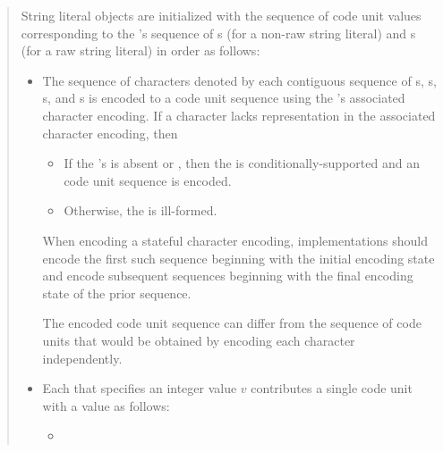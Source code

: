 \documentclass{wg21}
\begin{document}
\begin{quote}

String literal objects are initialized with
the sequence of code unit values
corresponding to the 's sequence of
s (for a non-raw string literal) and
s (for a raw string literal)
in order as follows:
\begin{itemize}
    \item
    The sequence of characters denoted by each contiguous sequence of
    s,
    s,
    s, and
    s
    is encoded to a code unit sequence
    using the 's associated character encoding.
    If a character lacks representation in the associated character encoding, then 
    \begin{removedblock}
        \begin{itemize}
            \item
            If the 's 
            is absent or ,
            then the  is conditionally-supported and
            an
            code unit sequence is encoded.
            \item
            Otherwise, the  is ill-formed.
        \end{itemize}
    \end{removedblock}
    When encoding a stateful character encoding,
    implementations should encode the first such sequence
    beginning with the initial encoding state and
    encode subsequent sequences
    beginning with the final encoding state of the prior sequence.
    \begin{note}
        The encoded code unit sequence can differ from
        the sequence of code units that would be obtained by
        encoding each character independently.
    \end{note}
    \item
    Each 
    that specifies an integer value $v$
    contributes a single code unit with a value as follows:
    \begin{itemize}
        \item

\end{itemize}
\end{itemize}
\end{quote}
\end{document}
